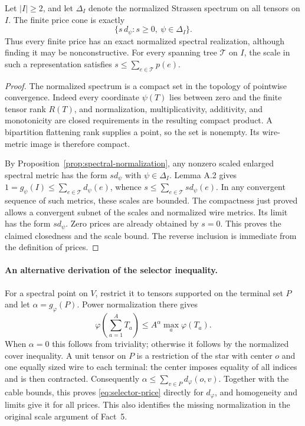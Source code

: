 


\begin{corollary}
\label{cor:price-normal-form}
Let $|I|\ge2$, and let $\Delta_I$ denote the normalized Strassen
spectrum on all tensors on $I$.  The finite price cone is exactly
\[
 \{s\,d_\psi:s\ge0,\ \psi\in\Delta_I\}.
\]
Thus every finite price has an exact normalized spectral realization,
although finding it may be nonconstructive.  For every spanning tree
$\mathcal T$ on $I$, the scale in such a representation satisfies
$s\le\sum_{e\in\mathcal T}p(e)$.
\end{corollary}
\begin{proof}
The normalized spectrum is a compact set in the topology of pointwise
convergence.  Indeed every coordinate $\psi(T)$ lies between zero and
the finite tensor rank $R(T)$, and normalization, multiplicativity,
additivity, and monotonicity are closed requirements in the resulting
compact product.  A bipartition flattening rank supplies a point, so
the set is nonempty.  Its wire-metric image is therefore compact.

By Proposition~\ref{prop:spectral-normalization}, any nonzero scaled
enlarged spectral metric has the form $s d_\psi$ with
$\psi\in\Delta_I$.  Lemma A.2 gives
$1=g_\psi(I)\le\sum_{e\in\mathcal T}d_\psi(e)$, whence
$s\le\sum_{e\in\mathcal T}s d_\psi(e)$.  In any convergent sequence
of such metrics, these scales are bounded.  The compactness just
proved allows a convergent subnet of the scales and normalized wire
metrics.  Its limit has the form $s d_\psi$.  Zero prices are already
obtained by $s=0$.  This proves the claimed closedness and the scale
bound.  The reverse inclusion is immediate from the definition of
prices.
\end{proof}

\paragraph{An alternative derivation of the selector inequality.}
For a spectral point on $V$, restrict it to tensors supported on the
terminal set $P$ and let $\alpha=g_\varphi(P)$.  Power normalization
there gives
\[
 \varphi\!\left(\sum_{a=1}^A T_a\right)
 \le A^\alpha\max_a\varphi(T_a).
\]
When $\alpha=0$ this follows from triviality; otherwise it follows by
the normalized cover inequality.  A unit tensor on $P$ is a restriction
of the star with center $o$ and one equally sized wire to each terminal:
the center imposes equality of all indices and is then contracted.
Consequently
$\alpha\le\sum_{v\in P}d_\varphi(o,v)$.
Together with the cable bounds, this proves
\eqref{eq:selector-price} directly for $d_\varphi$, and homogeneity and
limits give it for all prices.  This also identifies the missing
normalization in the original scale argument of Fact~5.

